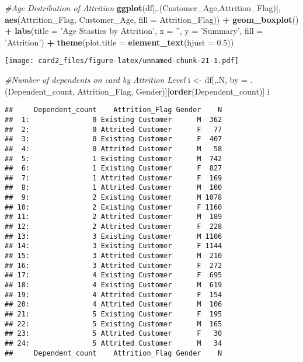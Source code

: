 \documentclass[]{article}
\newenvironment{Shaded}{\begin{snugshade}}{\end{snugshade}}
\newcommand{\CommentTok}[1]{\textcolor[rgb]{0.56,0.35,0.01}{\textit{#1}}}
\newcommand{\DataTypeTok}[1]{\textcolor[rgb]{0.13,0.29,0.53}{#1}}
\newcommand{\FloatTok}[1]{\textcolor[rgb]{0.00,0.00,0.81}{#1}}
\newcommand{\KeywordTok}[1]{\textcolor[rgb]{0.13,0.29,0.53}{\textbf{#1}}}
\newcommand{\NormalTok}[1]{#1}
\newcommand{\OperatorTok}[1]{\textcolor[rgb]{0.81,0.36,0.00}{\textbf{#1}}}
\newcommand{\StringTok}[1]{\textcolor[rgb]{0.31,0.60,0.02}{#1}}
\begin{document}
\begin{Shaded}
\begin{Highlighting}[]
\CommentTok{#Age Distribution of Attrition }
\KeywordTok{ggplot}\NormalTok{(df[,.(Customer_Age,Attrition_Flag)], }\KeywordTok{aes}\NormalTok{(Attrition_Flag, Customer_Age, }\DataTypeTok{fill =}\NormalTok{ Attrition_Flag)) }\OperatorTok{+}\StringTok{ }\KeywordTok{geom_boxplot}\NormalTok{() }\OperatorTok{+}
\StringTok{  }\KeywordTok{labs}\NormalTok{(}\DataTypeTok{title =} \StringTok{'Age Stastics by Attrition'}\NormalTok{, }\DataTypeTok{x =} \StringTok{''}\NormalTok{, }\DataTypeTok{y =} \StringTok{'Summary'}\NormalTok{, }\DataTypeTok{fill =} \StringTok{'Attrition'}\NormalTok{) }\OperatorTok{+}\StringTok{ }
\StringTok{  }\KeywordTok{theme}\NormalTok{(}\DataTypeTok{plot.title =} \KeywordTok{element_text}\NormalTok{(}\DataTypeTok{hjust =} \FloatTok{0.5}\NormalTok{))}
\end{Highlighting}
\end{Shaded}

\texttt{[image: card2\_files/figure-latex/unnamed-chunk-21-1.pdf]}

\begin{Shaded}
\begin{Highlighting}[]
\CommentTok{#Number of dependents on card by Attrition Level}
\NormalTok{i <-}\StringTok{ }\NormalTok{df[,.N, by =}\StringTok{ }\NormalTok{.(Dependent_count, Attrition_Flag, Gender)][}\KeywordTok{order}\NormalTok{(Dependent_count)]}
\NormalTok{i}
\end{Highlighting}
\end{Shaded}

\begin{verbatim}
##     Dependent_count    Attrition_Flag Gender    N
##  1:               0 Existing Customer      M  362
##  2:               0 Attrited Customer      F   77
##  3:               0 Existing Customer      F  407
##  4:               0 Attrited Customer      M   58
##  5:               1 Existing Customer      M  742
##  6:               1 Existing Customer      F  827
##  7:               1 Attrited Customer      F  169
##  8:               1 Attrited Customer      M  100
##  9:               2 Existing Customer      M 1078
## 10:               2 Existing Customer      F 1160
## 11:               2 Attrited Customer      M  189
## 12:               2 Attrited Customer      F  228
## 13:               3 Existing Customer      M 1106
## 14:               3 Existing Customer      F 1144
## 15:               3 Attrited Customer      M  210
## 16:               3 Attrited Customer      F  272
## 17:               4 Existing Customer      F  695
## 18:               4 Existing Customer      M  619
## 19:               4 Attrited Customer      F  154
## 20:               4 Attrited Customer      M  106
## 21:               5 Existing Customer      F  195
## 22:               5 Existing Customer      M  165
## 23:               5 Attrited Customer      F   30
## 24:               5 Attrited Customer      M   34
##     Dependent_count    Attrition_Flag Gender    N
\end{verbatim}
\end{document}
